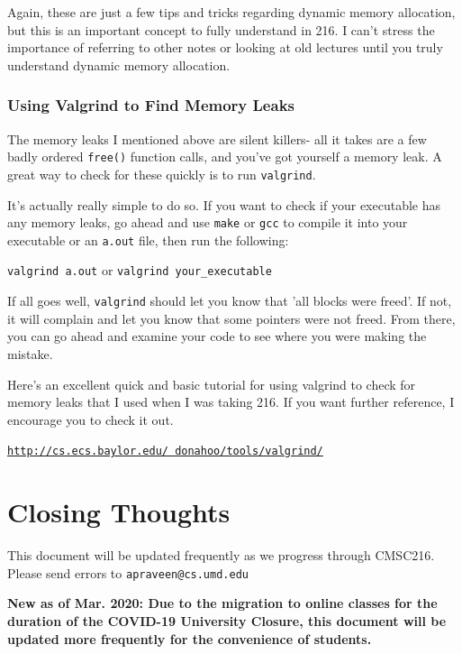 \documentclass[english, 10pt]{article}
\begin{document}
Again, these are just a few tips and tricks regarding dynamic memory allocation, but this is an important concept to fully understand in 216. I can't stress the importance of referring to other notes or looking at old lectures until you truly understand dynamic memory allocation.\newline

\subsubsection{Using Valgrind to Find Memory Leaks}

The memory leaks I mentioned above are silent killers- all it takes are a few badly ordered \texttt{free()} function calls, and you've got yourself a memory leak. A great way to check for these quickly is to run \texttt{valgrind}.\newline

It's actually really simple to do so. If you want to check if your executable has any memory leaks, go ahead and use \texttt{make} or \texttt{gcc} to compile it into your executable or an \texttt{a.out} file, then run the following:\newline

\texttt{valgrind a.out} or \texttt{valgrind your\_executable}\newline

If all goes well, \texttt{valgrind} should let you know that 'all blocks were freed'. If not, it will complain and let you know that some pointers were not freed. From there, you can go ahead and examine your code to see where you were making the mistake.\newline

Here's an excellent quick and basic tutorial for using valgrind to check for memory leaks that I used when I was taking 216. If you want further reference, I encourage you to check it out.\newline

\texttt{\href{http://cs.ecs.baylor.edu/~donahoo/tools/valgrind/}{http://cs.ecs.baylor.edu/~donahoo/tools/valgrind/}}



\section{Closing Thoughts}

This document will be updated frequently as we progress through CMSC216. Please send errors to \texttt{apraveen@cs.umd.edu}\newline

\textbf{New as of Mar. 2020: Due to the migration to online classes for the duration of the COVID-19 University Closure, this document will be updated more frequently for the convenience of students.}
\end{document}
